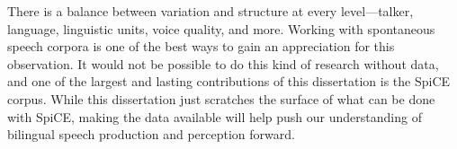 There is a balance between variation and structure at every level---talker, language, linguistic units, voice quality, and more. Working with spontaneous speech corpora is one of the best ways to gain an appreciation for this observation. It would not be possible to do this kind of research without data, and one of the largest and lasting contributions of this dissertation is the SpiCE corpus. While this dissertation just scratches the surface of what can be done with SpiCE, making the data available will help push our understanding of bilingual speech production and perception forward. 

\endinput 
